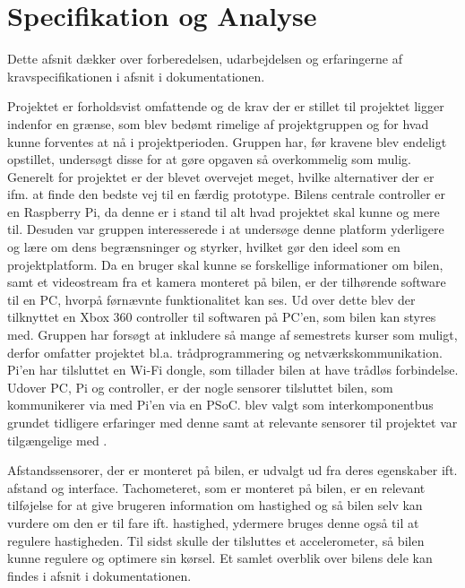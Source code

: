 \section{Specifikation og Analyse}\label{ch:Specifikation_og_Analyse}

Dette afsnit dækker over forberedelsen, udarbejdelsen og erfaringerne af kravspecifikationen i afsnit  i dokumentationen.

Projektet er forholdsvist omfattende og de krav der er stillet til projektet ligger indenfor en grænse, som blev bedømt rimelige af projektgruppen og for hvad kunne forventes at nå i projektperioden. 
Gruppen har, før kravene blev endeligt opstillet, undersøgt disse for at gøre opgaven så  overkommelig som mulig.
Generelt for projektet er der blevet overvejet meget, hvilke alternativer der er ifm. at finde den bedste vej til en færdig prototype.
Bilens centrale controller er en Raspberry Pi, da denne er i stand til alt hvad projektet skal kunne og mere til. 
Desuden var gruppen interesserede i at undersøge denne platform yderligere og lære om dens begrænsninger og styrker, hvilket gør den ideel som en projektplatform.
Da en bruger skal kunne se forskellige informationer om bilen, samt et videostream fra et kamera monteret på bilen, er der tilhørende software til en PC, hvorpå førnævnte funktionalitet kan ses.
Ud over dette blev der tilknyttet en Xbox 360 controller til softwaren på PC'en, som bilen kan styres med.
Gruppen har forsøgt at inkludere så mange af semestrets kurser som muligt, derfor omfatter projektet bl.a. trådprogrammering og netværkskommunikation. 
Pi'en har tilsluttet en Wi-Fi dongle, som tillader bilen at have trådløs forbindelse. Udover PC, Pi og controller, er der nogle sensorer tilsluttet bilen, som kommunikerer via \IIC med Pi'en via en PSoC. 
\IIC blev valgt som interkomponentbus grundet tidligere erfaringer med denne samt at relevante sensorer til projektet var tilgængelige med \IIC. 

Afstandssensorer, der er monteret på bilen, er udvalgt ud fra deres egenskaber ift. afstand og interface. Tachometeret, som er monteret på bilen, er en relevant tilføjelse for at give brugeren information om hastighed og så bilen selv kan vurdere om den er til fare ift. hastighed, ydermere bruges denne også til at regulere hastigheden. Til sidst skulle der tilsluttes et accelerometer, så bilen kunne regulere og optimere sin kørsel. 
Et samlet overblik over bilens dele kan findes i afsnit  i dokumentationen.

